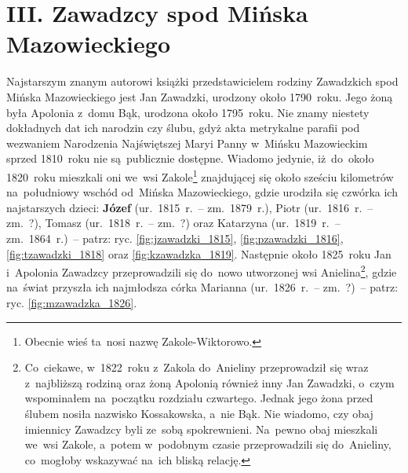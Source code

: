 
\newpage
\renewcommand{\thefigure}{Z3.\arabic{figure}}
\setcounter{figure}{0}

\section*{III. Zawadzcy spod Mińska Mazowieckiego}
\label{sec:zawadzcy}

Najstarszym znanym autorowi książki przedstawicielem rodziny Zawadzkich
spod Mińska Mazowieckiego jest Jan
Zawadzki, urodzony około
1790~roku. Jego żoną była
Apolonia z~domu Bąk,
urodzona około 1795~roku. Nie znamy niestety dokładnych dat ich narodzin czy
ślubu, gdyż akta metrykalne parafii pod wezwaniem Narodzenia Najświętszej
Maryi Panny w~Mińsku Mazowieckim sprzed 1810~roku nie są~publicznie dostępne.
Wiadomo jedynie, iż~do~około 1820~roku mieszkali oni we~wsi
Zakole\footnote{Obecnie wieś ta~nosi nazwę Zakole-Wiktorowo.} znajdującej się
około sześciu kilometrów na~południowy wschód od~Mińska Mazowieckiego, gdzie
urodziła się czwórka ich najstarszych dzieci:
\textbf{Józef} (ur.~1815~r.~--
zm.~1879~r.), Piotr
(ur.~1816~r.~-- zm.~?),
Tomasz (ur.~1818~r.~--
zm.~?) oraz
Katarzyna
(ur.~1819~r.~-- zm.~1864~r.)~-- patrz: ryc. \ref{fig:jzawadzki_1815},
\ref{fig:pzawadzki_1816}, \ref{fig:tzawadzki_1818} oraz
\ref{fig:kzawadzka_1819}. Następnie około 1825~roku
Jan
i~Apolonia Zawadzcy
przeprowadzili się do~nowo utworzonej wsi Anielina\footnote{Co~ciekawe,
w~1822~roku z~Zakola do~Anieliny przeprowadził się wraz z~najbliższą rodziną
oraz żoną Apolonią również inny Jan Zawadzki, o~czym wspominałem na~początku
rozdziału czwartego. Jednak jego żona przed ślubem nosiła nazwisko Kossakowska,
a~nie Bąk. Nie wiadomo, czy obaj imiennicy Zawadzcy byli ze~sobą spokrewnieni.
Na~pewno obaj mieszkali we~wsi Zakole, a~potem w~podobnym czasie
przeprowadzili się do~Anieliny, co~mogłoby wskazywać na~ich bliską relację.},
gdzie na~świat przyszła ich najmłodsza córka
Marianna (ur.~1826~r.~--
zm.~?)~-- patrz: ryc. \ref{fig:mzawadzka_1826}.

